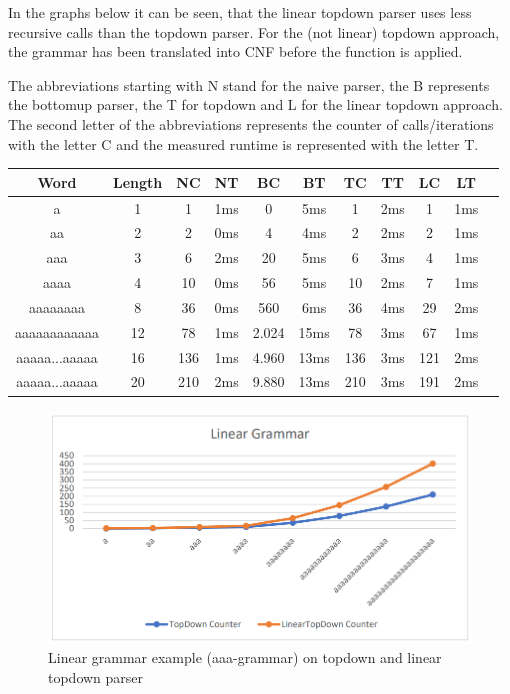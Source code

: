 \documentclass[a4paper, 11pt]{article}
\begin{document}
In the graphs below it can be seen, that the linear topdown parser uses less recursive calls than the topdown parser. For the (not linear) topdown approach, the grammar has been translated into CNF before the function is applied.

The abbreviations starting with N stand for the naive parser, the B represents the bottomup parser, the T for topdown and L for the linear topdown approach. The second letter of the abbreviations represents the counter of calls/iterations with the letter C and the measured runtime is represented with the letter T.

\begin{center}
\begin{tabular}{|c|c||c|c||c|c||c|c||c|c|c|}
\hline
Word & Length & NC & NT & BC & BT & TC & TT & LC & LT \\
\hline
\hline
a & 1 & 1 & 1ms & 0 & 5ms & 1 & 2ms & 1 & 1ms \\
\hline
aa & 2 & 2 & 0ms & 4 & 4ms & 2 & 2ms & 2 & 1ms \\
\hline
aaa & 3 & 6 & 2ms & 20 & 5ms & 6 & 3ms & 4 & 1ms \\
\hline
aaaa & 4 & 10 & 0ms & 56 & 5ms & 10 & 2ms & 7 & 1ms \\
\hline
aaaaaaaa & 8 & 36 & 0ms & 560 & 6ms & 36 & 4ms & 29 & 2ms \\
\hline
aaaaaaaaaaaa & 12 & 78 & 1ms & 2.024 & 15ms & 78 & 3ms &  67 & 1ms \\
\hline
aaaaa...aaaaa & 16 & 136 & 1ms & 4.960 & 13ms & 136 & 3ms & 121 & 2ms \\
\hline
aaaaa...aaaaa & 20 & 210 & 2ms & 9.880 & 13ms & 210 & 3ms & 191 & 2ms \\
\hline
\end{tabular}
\end{center}

\begin{figure}[H]
\begin{center}
\includegraphics[scale=0.4]{diagrams/LGBTQ.png}
\end{center}
\caption{Linear grammar example (aaa-grammar) on topdown and linear topdown parser}
\end{figure}
\end{document}
